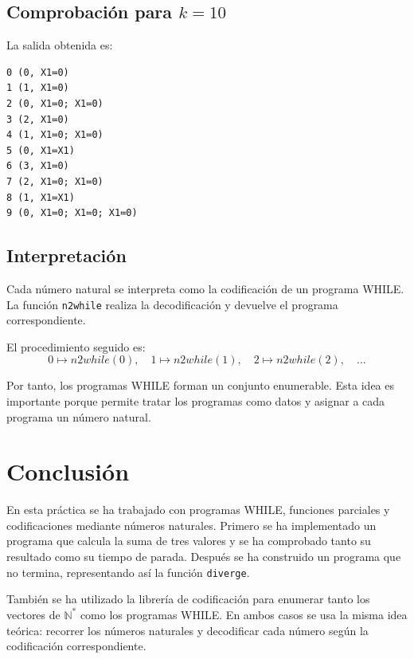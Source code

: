 \documentclass[11pt,a4paper]{article}
\begin{document}
\subsection{Comprobación para $k=10$}
La salida obtenida es:

\begin{lstlisting}
0 (0, X1≔0)
1 (1, X1≔0)
2 (0, X1≔0; X1≔0)
3 (2, X1≔0)
4 (1, X1≔0; X1≔0)
5 (0, X1≔X1)
6 (3, X1≔0)
7 (2, X1≔0; X1≔0)
8 (1, X1≔X1)
9 (0, X1≔0; X1≔0; X1≔0)
\end{lstlisting}

\subsection{Interpretación}
Cada número natural se interpreta como la codificación de un programa WHILE. La función \texttt{n2while} realiza la decodificación y devuelve el programa correspondiente.

El procedimiento seguido es:
\[
0\mapsto n2while(0),\quad
1\mapsto n2while(1),\quad
2\mapsto n2while(2),\quad \ldots
\]

Por tanto, los programas WHILE forman un conjunto enumerable. Esta idea es importante porque permite tratar los programas como datos y asignar a cada programa un número natural.


\section{Conclusión}

En esta práctica se ha trabajado con programas WHILE, funciones parciales y codificaciones mediante números naturales. Primero se ha implementado un programa que calcula la suma de tres valores y se ha comprobado tanto su resultado como su tiempo de parada. Después se ha construido un programa que no termina, representando así la función \texttt{diverge}.

También se ha utilizado la librería de codificación para enumerar tanto los vectores de $\mathbb{N}^{*}$ como los programas WHILE. En ambos casos se usa la misma idea teórica: recorrer los números naturales y decodificar cada número según la codificación correspondiente.
\end{document}
